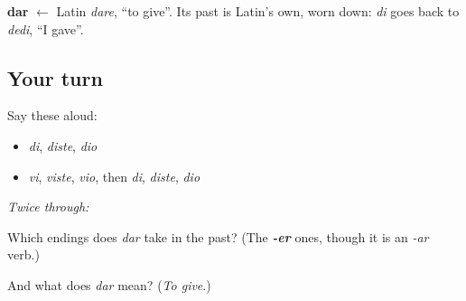 \begin{cousinweb}
\textbf{dar} $\leftarrow$ Latin \emph{dare}, \textquotedblleft{}to give\textquotedblright{}. Its past is Latin's own, worn down: \emph{di} goes back to \emph{dedi}, \textquotedblleft{}I gave\textquotedblright{}.
\end{cousinweb}

\subsection*{Your turn}
Say these aloud:

\begin{itemize}
\raggedright
  \item \emph{di}, \emph{diste}, \emph{dio}
  \item \emph{vi}, \emph{viste}, \emph{vio}, then \emph{di}, \emph{diste}, \emph{dio}
\end{itemize}

\emph{Twice through:}

\begin{tcolorbox}[breakable,colback=teal!4,colframe=teal!35!black,title={Before you move on}]
Which endings does \emph{dar} take in the past? (The \emph{\textbf{-er}} ones, though it is an \emph{-ar} verb.)

And what does \emph{dar} mean? (\emph{To give}.)
\end{tcolorbox}
